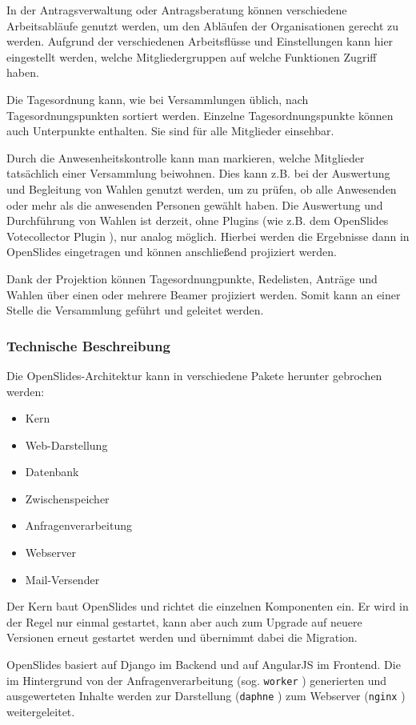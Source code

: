 \documentclass[11pt,a4paper]{article}
\begin{document}
In der Antragsverwaltung oder Antragsberatung können verschiedene Arbeitsabläufe
genutzt werden, um den Abläufen der Organisationen gerecht zu werden. Aufgrund 
der verschiedenen Arbeitsflüsse und Einstellungen kann hier eingestellt 
werden, welche Mitgliedergruppen auf welche Funktionen Zugriff haben.

Die Tagesordnung kann, wie bei Versammlungen üblich, nach Tagesordnungspunkten 
sortiert werden. Einzelne Tagesordnungspunkte können auch Unterpunkte 
enthalten. Sie sind für alle Mitglieder einsehbar.

Durch die Anwesenheitskontrolle kann man markieren, welche 
Mitglieder tatsächlich einer Versammlung beiwohnen. Dies kann z.B. bei 
der Auswertung und Begleitung von Wahlen genutzt werden, um zu prüfen, ob alle 
Anwesenden oder mehr als die anwesenden Personen gewählt haben. Die Auswertung 
und Durchführung von Wahlen ist derzeit, ohne Plugins (wie z.B. dem OpenSlides 
Votecollector Plugin \cite{osvc}), nur analog möglich. Hierbei werden die 
Ergebnisse dann in OpenSlides eingetragen und können anschließend projiziert 
werden.

Dank der Projektion können Tagesordnungpunkte, Redelisten, Anträge und Wahlen 
über einen oder mehrere Beamer projiziert werden. Somit kann an einer Stelle 
die Versammlung geführt und geleitet werden.
\newpage
\subsubsection{Technische Beschreibung}
\label{subsubsec:introfotb}
Die OpenSlides-Architektur \cite{osgh} kann in verschiedene Pakete herunter 
gebrochen werden:
\begin{itemize}
	\item Kern %
	\item Web-Darstellung %
	\item Datenbank %
	\item Zwischenspeicher %
	\item Anfragenverarbeitung %
	\item Webserver %
	\item Mail-Versender %
\end{itemize}
Der Kern baut OpenSlides und richtet die einzelnen Komponenten ein. Er wird in 
der Regel nur einmal gestartet, kann aber auch zum Upgrade auf neuere 
Versionen erneut gestartet werden und übernimmt dabei die Migration.

OpenSlides basiert auf Django \cite{djangohp} im Backend und auf AngularJS 
\cite{angularhp} im Frontend. Die im Hintergrund von der Anfragenverarbeitung 
(sog. \texttt{worker} \cite{daphne}) generierten und ausgewerteten Inhalte 
werden zur Darstellung (\texttt{daphne} \cite{daphne}) zum Webserver 
(\texttt{nginx} \cite{nginx}) weitergeleitet.
\end{document}
